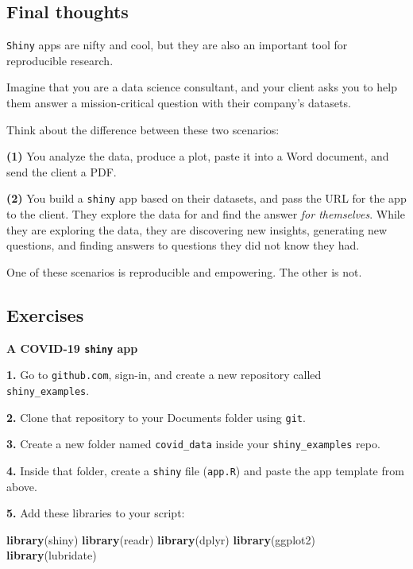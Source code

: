\documentclass[]{book}
\newenvironment{Shaded}{\begin{snugshade}}{\end{snugshade}}
\newcommand{\KeywordTok}[1]{\textcolor[rgb]{0.13,0.29,0.53}{\textbf{#1}}}
\newcommand{\NormalTok}[1]{#1}
\begin{document}
\hypertarget{final-thoughts-1}{%
\subsection*{Final thoughts}\label{final-thoughts-1}}

\texttt{Shiny} apps are nifty and cool, but they are also an important tool for reproducible research.

Imagine that you are a data science consultant, and your client asks you to help them answer a mission-critical question with their company's datasets.

Think about the difference between these two scenarios:

\textbf{(1)} You analyze the data, produce a plot, paste it into a Word document, and send the client a PDF.

\textbf{(2)} You build a \texttt{shiny} app based on their datasets, and pass the URL for the app to the client. They explore the data for and find the answer \emph{for themselves}. While they are exploring the data, they are discovering new insights, generating new questions, and finding answers to questions they did not know they had.

One of these scenarios is reproducible and empowering. The other is not.

\hypertarget{exercises-14}{%
\subsection*{Exercises}\label{exercises-14}}

\textbf{A COVID-19 \texttt{shiny} app}

\textbf{1.} Go to \texttt{github.com}, sign-in, and create a new repository called \texttt{shiny\_examples}.

\textbf{2.} Clone that repository to your Documents folder using \texttt{git}.

\textbf{3.} Create a new folder named \texttt{covid\_data} inside your \texttt{shiny\_examples} repo.

\textbf{4.} Inside that folder, create a \texttt{shiny} file (\texttt{app.R}) and paste the app template from above.

\textbf{5.} Add these libraries to your script:

\begin{Shaded}
\begin{Highlighting}[]
\KeywordTok{library}\NormalTok{(shiny)}
\KeywordTok{library}\NormalTok{(readr)}
\KeywordTok{library}\NormalTok{(dplyr)}
\KeywordTok{library}\NormalTok{(ggplot2)}
\KeywordTok{library}\NormalTok{(lubridate)}
\end{Highlighting}
\end{Shaded}
\end{document}
